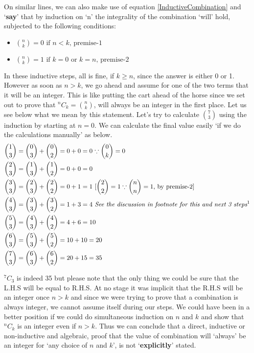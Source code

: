 \documentclass[10pt, twoside]{article}
\newcommand*{\Combination}[2]{{}^{#1}C_{#2}}%
\begin{document}
	On similar lines, we can also make use of equation \eqref{InductiveCombination} and `\textbf{say}' that by induction on `n' the integrality of the combination `will' hold, subjected to the following conditions:
	\begin{itemize}
	\item $\displaystyle \binom{n}{k} = 0 \text{ if $n < k$, premise-1}$
	\item $\displaystyle \binom{n}{k} = 1 \text{ if $k=0$ or $k=n$, premise-2}$
	\end{itemize}
	In these inductive steps, all is fine, if $k \geq n$, since the answer is either 0 or 1. However as soon as $n > k$, we go ahead and assume for one of the two terms that it will be an integer. This is like putting the cart ahead of the horse since we set out to prove that $\Combination{n}{k} = \binom{n}{k}$, will always be an integer in the first place. Let us see below what we mean by this statement. Let's try to calculate $\binom{7}{3}$ using the induction by starting at $n=0$. We can calculate the final value easily `if we do the calculations manually' as below.
	\begin{align}
	 \binom{1}{3} &= \binom{0}{3} + \binom{0}{2} = 0 + 0 = 0 \text{   $\because  \binom{0}{k}=0$ } \\
	 \binom{2}{3} &= \binom{1}{3} + \binom{1}{2} = 0 + 0 = 0 \\
	 \binom{3}{3} &= \binom{2}{3} + \binom{2}{2} = 0 + 1 = 1 \text{   [$\binom{2}{2}=1 \because  \binom{n}{n}=1$, by premise-2] } \\
	 \binom{4}{3} &= \binom{3}{3} + \binom{3}{2} = 1 + 3 = 4 \textit{ See the discussion in footnote for this and next 3 steps\footnotemark}\\
	 \binom{5}{3} &= \binom{4}{3} + \binom{4}{2} = 4 + 6 = 10 \\
	 \binom{6}{3} &= \binom{5}{3} + \binom{5}{2} = 10 + 10 = 20 \\
	 \binom{7}{3} &= \binom{6}{3} + \binom{6}{2} = 20 + 15 = 35	 	  	 	 
	\end{align}
	
	$\Combination{7}{3}$ is indeed 35 but please note that the only thing we could be sure that the L.H.S will be equal to R.H.S. At no stage it was implicit that the R.H.S will be an integer once $n > k$ and since we were trying to prove that a combination is always integer, we cannot assume itself during our steps. We could have been in a better position if we could do simultaneous induction on $n$ and $k$ and show that $\Combination{n}{k}$ is an integer even if $n > k$. Thus we can conclude that a direct, inductive or non-inductive and algebraic, proof that the value of combination will `always' be an integer for `any choice of $n$ and $k$', is not `\textbf{explicitly}' stated.  
	
\end{document}

